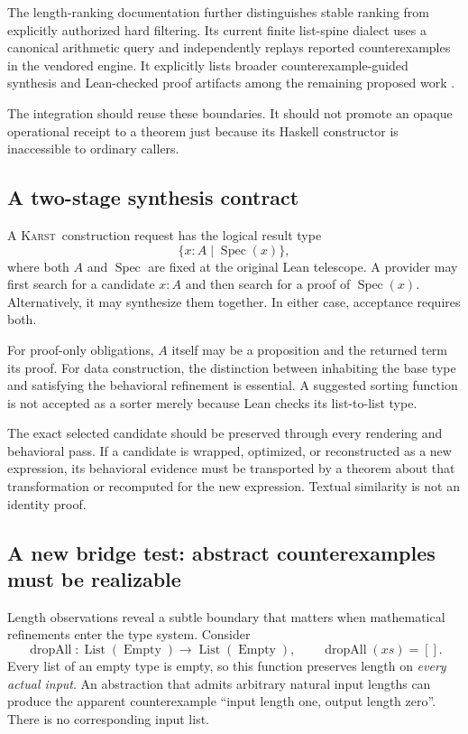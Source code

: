 \documentclass[11pt,letterpaper]{article}
\newcommand{\Karst}{\textsc{Karst}}
\newcommand{\Spec}{\operatorname{Spec}}
\theoremstyle{remark}
\begin{document}
The length-ranking documentation further distinguishes stable ranking from
explicitly authorized hard filtering. Its current finite list-spine dialect
uses a canonical arithmetic query and independently replays reported
counterexamples in the vendored engine. It explicitly lists broader
counterexample-guided synthesis and Lean-checked proof artifacts among the
remaining proposed work \cite{length}.

The integration should reuse these boundaries. It should not promote an
opaque operational receipt to a theorem just because its Haskell constructor
is inaccessible to ordinary callers.

\subsection{A two-stage synthesis contract}
A \Karst\ construction request has the logical result type
\[
  \{x:A\mid\Spec(x)\},
\]
where both $A$ and $\Spec$ are fixed at the original Lean telescope. A provider
may first search for a candidate $x:A$ and then search for a proof of
$\Spec(x)$. Alternatively, it may synthesize them together. In either case,
acceptance requires both.

For proof-only obligations, $A$ itself may be a proposition and the returned
term its proof. For data construction, the distinction between inhabiting the
base type and satisfying the behavioral refinement is essential. A suggested
sorting function is not accepted as a sorter merely because Lean checks its
list-to-list type.

The exact selected candidate should be preserved through every rendering and
behavioral pass. If a candidate is wrapped, optimized, or reconstructed as a
new expression, its behavioral evidence must be transported by a theorem
about that transformation or recomputed for the new expression. Textual
similarity is not an identity proof.

\subsection{A new bridge test: abstract counterexamples must be realizable}\label{sec:empty}
Length observations reveal a subtle boundary that matters when mathematical
refinements enter the type system. Consider
\[
 \operatorname{dropAll}:\operatorname{List}(\operatorname{Empty})
      \to\operatorname{List}(\operatorname{Empty}),
 \qquad \operatorname{dropAll}(xs)=[].
\]
Every list of an empty type is empty, so this function preserves length on
\emph{every actual input}. An abstraction that admits arbitrary natural input
lengths can produce the apparent counterexample ``input length one, output
length zero''. There is no corresponding input list.
\end{document}
